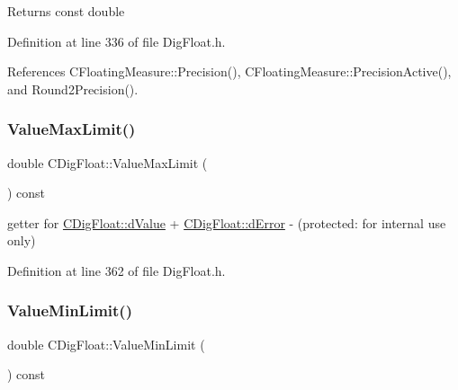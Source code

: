 \begin{DoxyReturn}{Returns}
const double 
\end{DoxyReturn}


Definition at line 336 of file Dig\+Float.\+h.



References C\+Floating\+Measure\+::\+Precision(), C\+Floating\+Measure\+::\+Precision\+Active(), and Round2\+Precision().

\mbox{\label{classCDigFloat_a20195234feac0aaa9acbb5ad0fcfeabb}} 
\subsubsection{\texorpdfstring{Value\+Max\+Limit()}{ValueMaxLimit()}}
{\footnotesize\ttfamily double C\+Dig\+Float\+::\+Value\+Max\+Limit (\begin{DoxyParamCaption}{ }\end{DoxyParamCaption}) const\hspace{0.3cm}{\ttfamily [inline]}}



getter for \hyperlink{classCDigFloat_a4bbe69e30dd4e20527362493aa9aaf96}{C\+Dig\+Float\+::d\+Value} + \hyperlink{classCDigFloat_a25eb3782d1e727ff007a48f8308e3d4d}{C\+Dig\+Float\+::d\+Error} -\/ (protected\+: for internal use only) 



Definition at line 362 of file Dig\+Float.\+h.

\mbox{\label{classCDigFloat_a89603e1f9b9061b65376ac7b5fffddcf}} 
\subsubsection{\texorpdfstring{Value\+Min\+Limit()}{ValueMinLimit()}}
{\footnotesize\ttfamily double C\+Dig\+Float\+::\+Value\+Min\+Limit (\begin{DoxyParamCaption}{ }\end{DoxyParamCaption}) const\hspace{0.3cm}{\ttfamily [inline]}}



